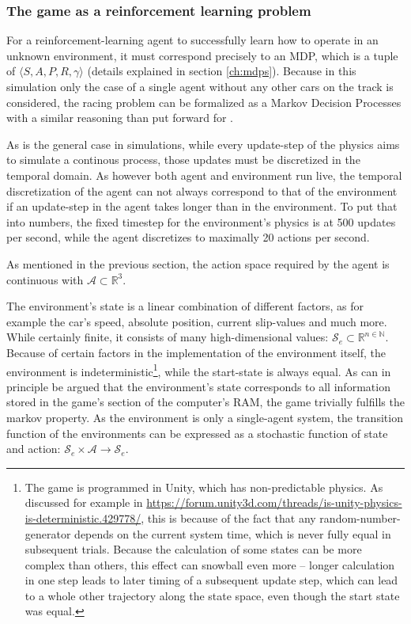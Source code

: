 \subsubsection{The game as a reinforcement learning problem}

For a reinforcement-learning agent to successfully learn how to operate in an unknown environment, it must correspond precisely to an MDP, which is a tuple of $\langle S, A, P, R, \gamma \rangle$ (details explained in section \ref{ch:mdps}). Because in this simulation only the case of a single agent without any other cars on the track is considered, the racing problem can be formalized as a Markov Decision Processes with a similar reasoning than \citet[chapter 4]{wymann_torcs_2015} put forward for . 

As is the general case in simulations, while every update-step of the physics aims to simulate a continous process, those updates must be discretized in the temporal domain. As however both agent and environment run live, the temporal discretization of the agent can not always correspond to that of the environment if an update-step in the agent takes longer than in the environment. To put that into numbers, the fixed timestep for the environment's physics is at 500 updates per second, while the agent discretizes to maximally 20 actions per second.

As mentioned in the previous section, the action space required by the agent is continuous with $\mathcal{A} \subset \mathds{R}^3$. 

The environment's state is a linear combination of different factors, as for example the car's speed, absolute position, current slip-values and much more. While certainly finite, it consists of many high-dimensional values: $\mathcal{S}_e \subset \mathds{R}^{n \in \mathds{N}}$. Because of certain factors in the implementation of the environment itself, the environment is indeterministic\footnote{The game is programmed in Unity, which has non-predictable physics. As discussed for example in \url{https://forum.unity3d.com/threads/is-unity-physics-is-deterministic.429778/}, this is because of the fact that any random-number-generator depends on the current system time, which is never fully equal in subsequent trials. Because the calculation of some states can be more complex than others, this effect can snowball even more -- longer calculation in one step leads to later timing of a subsequent update step, which can lead to a whole other trajectory along the state space, even though the start state was equal.}, while the start-state is always equal. As can in principle be argued that the environment's state corresponds to all information stored in the game's section of the computer's RAM, the game trivially fulfills the markov property. As the environment is only a single-agent system, the transition function of the environments can be expressed as a stochastic function of state and action: $\mathcal{S}_e \times \mathcal{A} \rightarrow \mathcal{S}_e$.

